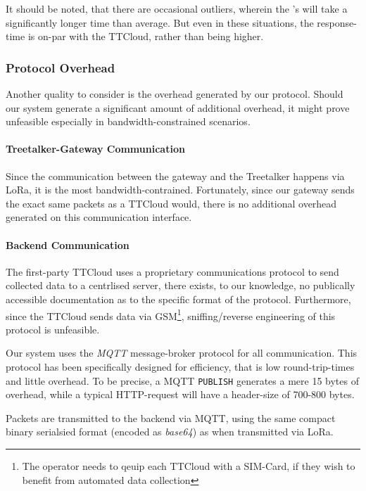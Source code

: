 It should be noted, that there are occasional outliers, wherein the {\ttt}'s will take a significantly longer time than average.
But even in these situations, the response-time is on-par with the TTCloud, rather than being higher.

\subsubsection{Protocol Overhead}
\label{sec:evaluation:overhead}

Another quality to consider is the overhead generated by our protocol.
Should our system generate a significant amount of additional overhead, it might prove unfeasible especially in bandwidth-constrained scenarios.

\paragraph{Treetalker-Gateway Communication}

Since the communication between the gateway and the Treetalker happens via LoRa, it is the most bandwidth-contrained.
Fortunately, since our gateway sends the exact same packets as a TTCloud would, there is no additional overhead generated on this communication interface.

\paragraph{Backend Communication}

The first-party TTCloud uses a proprietary communications protocol to send collected data to a centrlised server, there exists, to our knowledge, no publically accessible documentation as to the specific format of the protocol.
Furthermore, since the TTCloud sends data via GSM\footnote{The operator needs to qeuip each TTCloud with a SIM-Card, if they wish to benefit from automated data collection}, sniffing/reverse engineering of this protocol is unfeasible.

Our system uses the \textit{MQTT} message-broker protocol for all communication.
This protocol has been specifically designed for efficiency, that is low round-trip-times and little overhead.
To be precise, a MQTT \texttt{PUBLISH} generates a mere 15 bytes of overhead\cite{MQTT}, while a typical HTTP-request will have a header-size of 700-800 bytes\cite{SPDY}.

Packets are transmitted to the backend via MQTT, using the same compact binary serialsied format (encoded as \textit{base64}) as when transmitted via LoRa.

